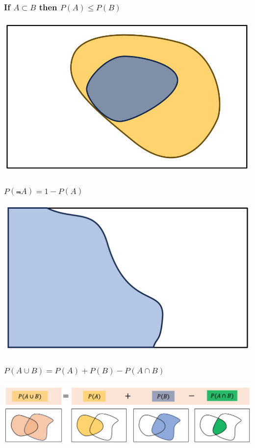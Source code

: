 \documentclass[compress]{beamer}
\begin{document}
\begin{frame}\frametitle{ If $A\subset B $ then $P(A)\leq P(B) $}
\begin{center}
\includegraphics[scale=.4]{figs/PALessPB.png} 
\end{center}
\vspace{1in}
\end{frame}



\begin{frame}\frametitle{$P(\Not{A})=1-P(A)$}
\begin{center}
\includegraphics[scale=.26]{figs/A_complement.png} 
\end{center}
\vspace{1in}
\end{frame}


\begin{frame}\frametitle{$P(A\cup B)= P(A)+P(B)-P(A\cap B)$}
\includegraphics[scale=.26]{figs/P_A_UNION_B.png} 
\vspace{1in}
\end{frame}
\end{document}
